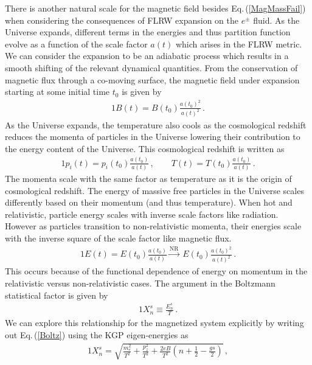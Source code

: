 \documentclass[twocolumn,preprintnumbers,amsmath,amssymb]{revtex4-2}
\newcommand{\req}[1]{Eq.\,({\ref{#1}})}
\begin{document}

There is another natural scale for the magnetic field besides \req{MagMassFail} when considering the consequences of FLRW expansion on the $e^{\pm}$ fluid. As the Universe expands, different terms in the energies and thus partition function evolve as a function of the scale factor $a(t)$ which arises in the FLRW metric. We can consider the expansion to be an adiabatic process which results in a smooth shifting of the relevant dynamical quantities. From the conservation of magnetic flux through a co-moving surface, the magnetic field under expansion starting at some initial time $t_{0}$ is given by
\begin{alignat}{1}
 \label{BScale} B(t) = B(t_{0})\frac{a(t_{0})^{2}}{a(t)^{2}}\,.
\end{alignat}
As the Universe expands, the temperature also cools as the cosmological redshift reduces the momenta of particles in the Universe lowering their contribution to the energy content of the Universe. This cosmological redshift is written as
\begin{alignat}{1}
 \label{Redshift} p_{i}(t) = p_{i}(t_{0})\frac{a(t_{0})}{a(t)}\,,\qquad T(t) = T(t_{0})\frac{a(t_{0})}{a(t)}\,.
\end{alignat}
The momenta scale with the same factor as temperature as it is the origin of cosmological redshift. The energy of massive free particles in the Universe scales differently based on their momentum (and thus temperature). When hot and relativistic, particle energy scales with inverse scale factors like radiation. However as particles transition to non-relativistic momenta, their energies scale with the inverse square of the scale factor like magnetic flux.
\begin{alignat}{1}
 \label{EScale} E(t) = E(t_{0})\frac{a(t_{0})}{a(t)}\xrightarrow{\mathrm{NR}}\ E(t_{0})\frac{a(t_{0})^{2}}{a(t)^{2}}\,.
\end{alignat}
This occurs because of the functional dependence of energy on momentum in the relativistic versus non-relativistic cases. The argument in the Boltzmann statistical factor is given by
\begin{alignat}{1}
 \label{Boltz} X_{n}^{s}\equiv\frac{E_{n}^{s}}{T}\,.
\end{alignat}
We can explore this relationship for the magnetized system explicitly by writing out \req{Boltz} using the KGP eigen-energies as
\begin{alignat}{1}
 \label{XExplicit} X_{n}^{s} = \sqrt{\frac{m_{e}^{2}}{T^{2}}+\frac{p_{z}^{2}}{T^{2}}+\frac{2eB}{T^{2}}\left(n+\frac{1}{2}-\frac{gs}{2}\right)}\,,
\end{alignat}
\end{document}
